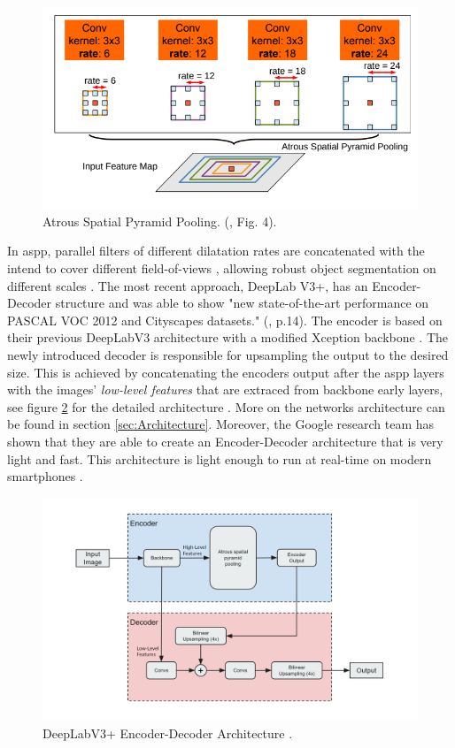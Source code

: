 \documentclass[11pt,
  paper=a4, 
  bibliography=totocnumbered,
	captions=tableheading,
	BCOR=10mm
]{scrreprt}
\theoremstyle{definition}
\def \figwidth {0.9\linewidth}
\begin{document}
\begin{figure}[H]
	\centering
	\includegraphics[width=\figwidth]{ASPP}
	\caption[Atrous Spatial Pyramid Pooling]{
		Atrous Spatial Pyramid Pooling. (\cite{Chen2018}, Fig. 4).
		\label{fig:ASPP}}
\end{figure}


In \gls{aspp}, parallel filters of different dilatation rates are concatenated with the intend to cover different field-of-views \cite{Chen2018}, allowing robust object segmentation on different scales \cite{Minaee2020}.
The most recent approach, DeepLab V3+, has an Encoder-Decoder structure and was able to show "new state-of-the-art performance on PASCAL VOC 2012 and Cityscapes datasets." (\cite{Chen2018b}, p.14).
The encoder is based on their previous DeepLabV3 architecture with a modified Xception backbone \cite{Minaee2020}.
The newly introduced decoder is responsible for upsampling the output to the desired size.
This is achieved by concatenating the encoders output after the \Gls{aspp} layers with the images' \textit{low-level features} that are extraced from backbone early layers, see figure \ref{fig:DLPlus} for the detailed architecture \cite{Chen2018b}.
More on the networks architecture can be found in section \ref{sec:Architecture}.
Moreover, the Google research team has shown that they are able to create an Encoder-Decoder architecture that is very light and fast.
This architecture is light enough to run at real-time on modern smartphones \cite{Bazarevsky2018}.

\begin{figure}[H]
	\centering
	\includegraphics[width=\figwidth]{DLV3Plus}
	\caption[DeepLabV3+ Architecture]{
		DeepLabV3+ Encoder-Decoder Architecture \cite{Chen2018b}.
		\label{fig:DLPlus}}
\end{figure}
\end{document}
